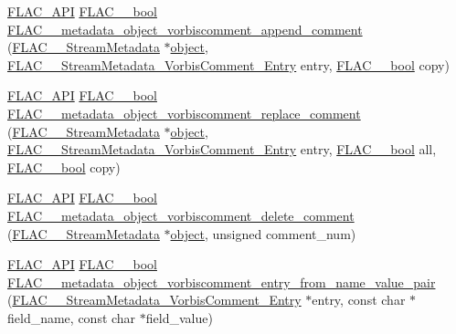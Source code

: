 \begin{DoxyCompactItemize}
\item 
\mbox{\hyperlink{group__flac__export_ga56ca07df8a23310707732b1c0007d6f5}{F\+L\+A\+C\+\_\+\+A\+PI}} \mbox{\hyperlink{ordinals_8h_a95103469f1cbd78b8cf250194985b34e}{F\+L\+A\+C\+\_\+\+\_\+bool}} \mbox{\hyperlink{group__flac__metadata__object_gad04ef80ae5f852db8f3729a6ef8c1631}{F\+L\+A\+C\+\_\+\+\_\+metadata\+\_\+object\+\_\+vorbiscomment\+\_\+append\+\_\+comment}} (\mbox{\hyperlink{struct_f_l_a_c_____stream_metadata}{F\+L\+A\+C\+\_\+\+\_\+\+Stream\+Metadata}} $\ast$\mbox{\hyperlink{_s_d_l__opengl__glext_8h_ab49790263c78300fbf05719e38246198}{object}}, \mbox{\hyperlink{struct_f_l_a_c_____stream_metadata___vorbis_comment___entry}{F\+L\+A\+C\+\_\+\+\_\+\+Stream\+Metadata\+\_\+\+Vorbis\+Comment\+\_\+\+Entry}} entry, \mbox{\hyperlink{ordinals_8h_a95103469f1cbd78b8cf250194985b34e}{F\+L\+A\+C\+\_\+\+\_\+bool}} copy)
\item 
\mbox{\hyperlink{group__flac__export_ga56ca07df8a23310707732b1c0007d6f5}{F\+L\+A\+C\+\_\+\+A\+PI}} \mbox{\hyperlink{ordinals_8h_a95103469f1cbd78b8cf250194985b34e}{F\+L\+A\+C\+\_\+\+\_\+bool}} \mbox{\hyperlink{group__flac__metadata__object_gabef3625575b7e4c7257617a27220959a}{F\+L\+A\+C\+\_\+\+\_\+metadata\+\_\+object\+\_\+vorbiscomment\+\_\+replace\+\_\+comment}} (\mbox{\hyperlink{struct_f_l_a_c_____stream_metadata}{F\+L\+A\+C\+\_\+\+\_\+\+Stream\+Metadata}} $\ast$\mbox{\hyperlink{_s_d_l__opengl__glext_8h_ab49790263c78300fbf05719e38246198}{object}}, \mbox{\hyperlink{struct_f_l_a_c_____stream_metadata___vorbis_comment___entry}{F\+L\+A\+C\+\_\+\+\_\+\+Stream\+Metadata\+\_\+\+Vorbis\+Comment\+\_\+\+Entry}} entry, \mbox{\hyperlink{ordinals_8h_a95103469f1cbd78b8cf250194985b34e}{F\+L\+A\+C\+\_\+\+\_\+bool}} all, \mbox{\hyperlink{ordinals_8h_a95103469f1cbd78b8cf250194985b34e}{F\+L\+A\+C\+\_\+\+\_\+bool}} copy)
\item 
\mbox{\hyperlink{group__flac__export_ga56ca07df8a23310707732b1c0007d6f5}{F\+L\+A\+C\+\_\+\+A\+PI}} \mbox{\hyperlink{ordinals_8h_a95103469f1cbd78b8cf250194985b34e}{F\+L\+A\+C\+\_\+\+\_\+bool}} \mbox{\hyperlink{group__flac__metadata__object_ga2d1b309d4ca207039ad6d19bd779800f}{F\+L\+A\+C\+\_\+\+\_\+metadata\+\_\+object\+\_\+vorbiscomment\+\_\+delete\+\_\+comment}} (\mbox{\hyperlink{struct_f_l_a_c_____stream_metadata}{F\+L\+A\+C\+\_\+\+\_\+\+Stream\+Metadata}} $\ast$\mbox{\hyperlink{_s_d_l__opengl__glext_8h_ab49790263c78300fbf05719e38246198}{object}}, unsigned comment\+\_\+num)
\item 
\mbox{\hyperlink{group__flac__export_ga56ca07df8a23310707732b1c0007d6f5}{F\+L\+A\+C\+\_\+\+A\+PI}} \mbox{\hyperlink{ordinals_8h_a95103469f1cbd78b8cf250194985b34e}{F\+L\+A\+C\+\_\+\+\_\+bool}} \mbox{\hyperlink{group__flac__metadata__object_ga0ec0c7ddd3a8832ee7a75bf47956b1c7}{F\+L\+A\+C\+\_\+\+\_\+metadata\+\_\+object\+\_\+vorbiscomment\+\_\+entry\+\_\+from\+\_\+name\+\_\+value\+\_\+pair}} (\mbox{\hyperlink{struct_f_l_a_c_____stream_metadata___vorbis_comment___entry}{F\+L\+A\+C\+\_\+\+\_\+\+Stream\+Metadata\+\_\+\+Vorbis\+Comment\+\_\+\+Entry}} $\ast$entry, const char $\ast$field\+\_\+name, const char $\ast$field\+\_\+value)

\end{DoxyCompactItemize}
